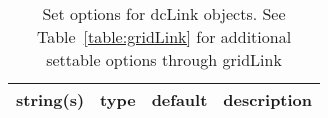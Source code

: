\begin{table}[ht]
\centering
\begin{tabular}{p{5cm} c c p{7cm}}
\hline
string(s) & type & default & description \\
\hline
\hline
\end{tabular}
\caption{Set options for dcLink objects. See Table~\ref{table:gridLink} for additional settable options through gridLink}
\label{table:dcLink}
\end{table}


